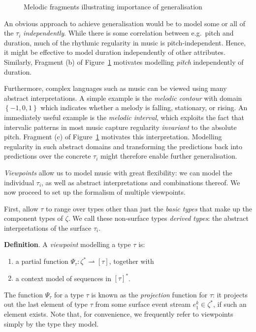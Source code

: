 \documentclass[12pt,a4paper,twoside,openright]{report}
\newcommand{\set}[1]{ \left\{ #1 \right\} }
\begin{document}
\begin{figure}[H]
\centering

\caption{Melodic fragments illustrating importance of generalisation}
\label{fig:generalise}
\end{figure}

An obvious approach to achieve generalisation would be to model some or all of
the $\tau_i$ \emph{independently}. While there is some correlation between e.g.\
pitch and duration, much of the rhythmic regularity in music is
pitch-independent. Hence, it might be effective to model duration independently
of other attributes. Similarly, Fragment (b) of Figure~\ref{fig:generalise}
motivates modelling \emph{pitch} independently of duration.

Furthermore, complex languages such as music can be viewed using many abstract
interpretations. A simple example is the \emph{melodic contour} with domain
$\set{-1,0,1}$ which indicates whether a melody is falling, stationary, or
rising. An immediately useful example is the \emph{melodic interval}, which
exploits the fact that intervalic patterns in most music capture regularity
\emph{invariant} to the absolute pitch. Fragment (c) of
Figure~\ref{fig:generalise} motivates this interpretation. Modelling regularity
in such abstract domains and transforming the predictions back into predictions
over the concrete $\tau_i$ might therefore enable further generalisation.

\emph{Viewpoints} allow us to model music with great flexibility: we can model
the individual $\tau_i$, as well as abstract interpretations and combinations
thereof. We now proceed to set up the formalism of multiple viewpoints.

First, allow $\tau$ to range over types other than just the \emph{basic types}
that make up the component types of $\zeta$. We call these non-surface types
\emph{derived types}: the abstract interpretations of the surface $\tau_i$. 

\textbf{Definition}. A \emph{viewpoint} modelling a type $\tau$ is:
\begin{enumerate}[label=\arabic*., itemsep=0mm]
  \item a partial function $\Psi_\tau : \zeta^* \rightharpoonup [\tau]$,
    together with
  \item a context model of sequences in $[\tau]^*$.
\end{enumerate}

The function $\Psi_\tau$ for a type $\tau$ is known as the \emph{projection}
function for $\tau$: it projects out the last element of type $\tau$ from some
surface event stream $e_1^k \in \zeta^*$, if such an element exists. Note that,
for convenience, we frequently refer to viewpoints simply by the type they
model. 
\end{document}
